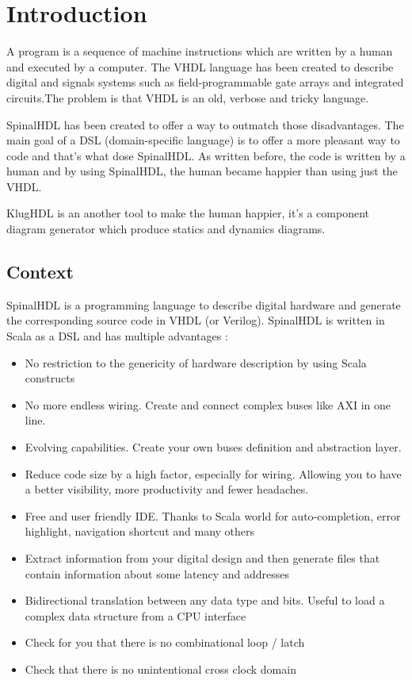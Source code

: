 \chapter{Introduction}
\label{cha:Introduction}

A program is a sequence of machine instructions which are written by a
human and executed by a computer. The VHDL language has been created to describe
digital and signals systems such as field-programmable gate arrays and
integrated circuits\cite{wiki-vhdl}.The problem is that VHDL is an old, verbose
and tricky language.

SpinalHDL has been created to offer a way to outmatch those disadvantages. The
main goal of a DSL (domain-specific language) is to offer a more pleasant way to
code and that's what dose SpinalHDL. As written before, the code is written by a
human and by using SpinalHDL, the human became happier than using just the VHDL.

KlugHDL is an another tool to make the human happier, it's a component diagram
generator which produce statics and dynamics diagrams.

\section{Context}
\label{sec:Context}

SpinalHDL is a programming language to describe digital hardware and generate
the corresponding source code in VHDL (or Verilog). SpinalHDL is written in Scala as a DSL
and has multiple advantages\cite{github-spinalhdl} :
\begin{itemize}
    \item No restriction to the genericity of hardware description by using
      Scala constructs
    \item No more endless wiring. Create and connect complex buses like AXI in one line.
    \item Evolving capabilities. Create your own buses definition and abstraction layer.
    \item Reduce code size by a high factor, especially for wiring. Allowing you
      to have a better visibility, more productivity and fewer headaches.
    \item Free and user friendly IDE. Thanks to Scala world for auto-completion,
      error highlight, navigation shortcut and many others
    \item Extract information from your digital design and then generate files
      that contain information about some latency and addresses
    \item Bidirectional translation between any data type and bits. Useful to
      load a complex data structure from a CPU interface
    \item Check for you that there is no combinational loop / latch
    \item Check that there is no unintentional cross clock domain
\end{itemize}

